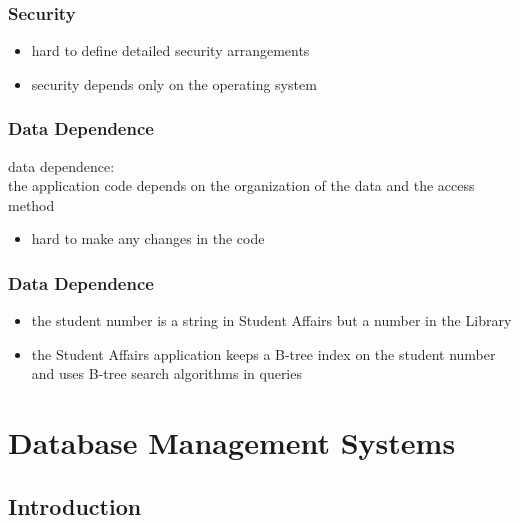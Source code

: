 \documentclass[dvipsnames]{beamer}
\theoremstyle{plain}
\begin{document}
\begin{frame}
  \frametitle{Security}

  \begin{itemize}
    \item hard to define detailed security arrangements
    \item security depends only on the operating system
  \end{itemize}
\end{frame}

\begin{frame}
  \frametitle{Data Dependence}

  \begin{definition}
    \alert{data dependence}:\\
      the application code depends on the organization of the data and the
      access method

    \begin{itemize}
      \item hard to make any changes in the code
    \end{itemize}
  \end{definition}
\end{frame}

\begin{frame}
  \frametitle{Data Dependence}

  \begin{example}
    \begin{itemize}
      \item the student number is a string in Student Affairs but a number in
        the Library

      \pause
      \item the Student Affairs application keeps a B-tree index on the student
        number and uses B-tree search algorithms in queries
    \end{itemize}
  \end{example}
\end{frame}

\section{Database Management Systems}

\subsection{Introduction}
\end{document}
